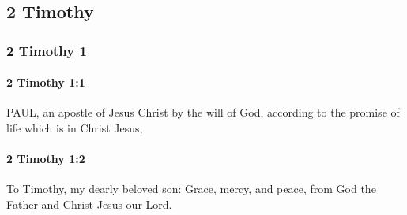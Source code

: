 \subsection{2 Timothy}
	\label{2TIMOTHY}
	
	\subsubsection{2 Timothy 1} %
		\label{2TIMOTHY-1}
		
		\paragraph{2 Timothy 1:1} %
			\label{2TIMOTHY-1-1}

			PAUL, an apostle of Jesus Christ by the will of God, according to the promise of life which is in Christ Jesus,

			\begin{framed}
			\scriptsize
				\begin{compactdesc}
					\item[SBLG] 
				\end{compactdesc}
			\end{framed}

		\paragraph{2 Timothy 1:2} %
			\label{2TIMOTHY-1-2}

			To Timothy, my dearly beloved son: Grace, mercy, and peace, from God the Father and Christ Jesus our Lord.

